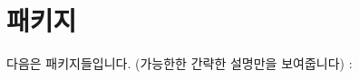 \section{패키지}
다음은 패키지들입니다. (가능한한 간략한 설명만을 보여줍니다) \+:\begin{DoxyCompactList}
\item{}
\end{DoxyCompactList}
